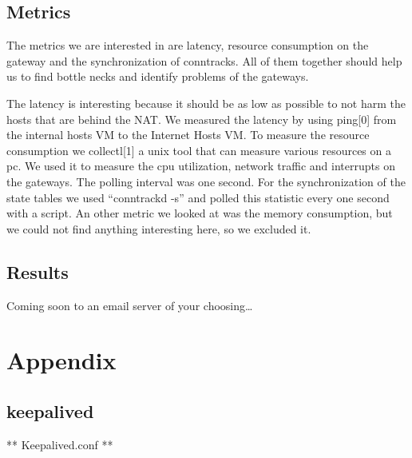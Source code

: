 \subsection{Metrics}\label{metrics}

The metrics we are interested in are latency, resource consumption on
the gateway and the synchronization of conntracks. All of them together
should help us to find bottle necks and identify problems of the
gateways.

The latency is interesting because it should be as low as possible to
not harm the hosts that are behind the NAT. We measured the latency by
using ping{[}0{]} from the internal hosts VM to the Internet Hosts VM.
To measure the resource consumption we collectl{[}1{]} a unix tool that
can measure various resources on a pc. We used it to measure the cpu
utilization, network traffic and interrupts on the gateways. The polling
interval was one second. For the synchronization of the state tables we
used ``conntrackd -s'' and polled this statistic every one second with a
script. An other metric we looked at was the memory consumption, but we
could not find anything interesting here, so we excluded it.

\subsection{Results}\label{results}

Coming soon to an email server of your choosing\ldots{}

\section{Appendix}\label{appendix}

\subsection{keepalived}\label{keepalived-1}

** Keepalived.conf **

